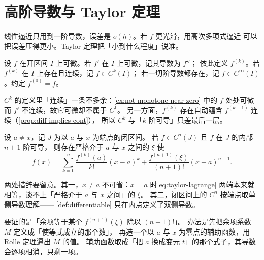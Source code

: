 \section{高阶导数与 Taylor 定理}
\label{sec:taylor}

线性逼近只用到一阶导数，误差是 \(o(h)\)。若 \(f\) 更光滑，用高次多项式逼近
可以把误差压得更小。Taylor 定理把「小到什么程度」说准。

\begin{definition}[高阶导数]
  \label{def:higher-derivative}
  设 \(f\) 在开区间 \(I\) 上可微。若 \(f'\) 在 \(I\) 上可微，记其导数为 \(f''\)；
  依此定义 \(f^{(k)}\)。若 \(f^{(k)}\) 在 \(I\) 上存在且连续，记 \(f \in C^{k}(I)\)；
  若一切阶导数都存在，记 \(f \in C^{\infty}(I)\)。约定 \(f^{(0)}=f\)。
\end{definition}

\begin{remark}
  \(C^{k}\) 的定义里「连续」一条不多余：\cref{ex:not-monotone-near-zero} 中的 \(f\)
  处处可微而 \(f'\) 不连续，故它可微却不属于 \(C^{1}\)。
  另一方面，\(f^{(k)}\) 存在自动蕴含 \(f^{(k-1)}\) 连续（\cref{prop:diff-implies-cont}），
  所以 \(C^{k}\) 与「\(k\) 阶可导」只差最后一层。
\end{remark}

\begin{theorem}
  \label{thm:taylor-lagrange}
  设 \(a \neq x\)，记 \(J\) 为以 \(a\) 与 \(x\) 为端点的闭区间。
  若 \(f \in C^{n}(J)\) 且 \(f\) 在 \(J\) 的内部 \(n+1\) 阶可导，
  则存在严格介于 \(a\) 与 \(x\) 之间的 \(\xi\) 使
  \begin{equation}
    \label{eq:taylor-lagrange}
    f(x) = \sum_{k=0}^{n} \frac{f^{(k)}(a)}{k!}(x-a)^{k}
         + \frac{f^{(n+1)}(\xi)}{(n+1)!}(x-a)^{n+1} .
  \end{equation}
\end{theorem}

\begin{remark}
  两处措辞要留意。其一，\(x \neq a\) 不可省：\(x=a\) 时\cref{eq:taylor-lagrange}
  两端本来就相等，谈不上「严格介于 \(a\) 与 \(x\) 之间」的 \(\xi\)。
  其二，闭区间上的 \(C^{n}\) 按端点取单侧导数理解——
  \cref{def:differentiable} 只在内点定义了双侧导数。
\end{remark}

\begin{strategy}
  要证的是「余项等于某个 \(f^{(n+1)}(\xi)\) 除以 \((n+1)!\)」。
  办法是先把余项系数 \(M\) 定义成「使等式成立的那个数」，
  再造一个以 \(a\) 与 \(x\) 为零点的辅助函数，用 Rolle 定理逼出 \(M\) 的值。
  辅助函数取成「把 \(a\) 换成变元 \(t\)」的那个式子，其导数会逐项相消，只剩一项。
\end{strategy}

